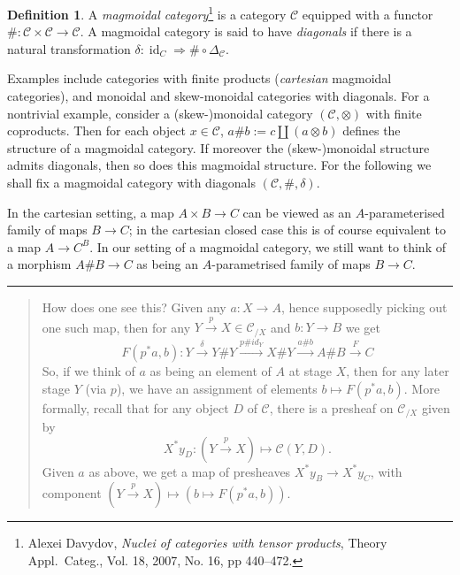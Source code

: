 \documentclass{tufte-handout}
\theoremstyle{definition}
\newtheorem*{definition}{Definition}
\DeclareMathOperator{\id}{id}
\DeclareMathOperator{\Pre}{Pre}
\def\CC{\mathcal{C}}
\begin{document}
\begin{definition}
A \emph{magmoidal category}\footnote{Alexei Davydov, \emph{Nuclei of categories with tensor products}, Theory
Appl.\ Categ., Vol. 18, 2007, No. 16, pp 440--472.} is a category $\CC$ equipped with a functor $\# \colon \CC\times \CC\to \CC$.
A magmoidal category is said to have \emph{diagonals} if there is a natural transformation $\delta\colon \id_C \Rightarrow \#\circ \Delta_\CC$. 
\end{definition}


Examples include categories with finite products (\emph{cartesian} magmoidal categories), and monoidal and skew-monoidal categories with diagonals.
For a nontrivial example, consider a (skew-)monoidal category $(\mathcal{C},\otimes)$ with finite coproducts. 
Then for each object $x\in \mathcal{C}$, $a\# b := c\amalg (a\otimes b)$ defines the structure of a magmoidal category.
If moreover the (skew-)monoidal structure admits diagonals, then so does this magmoidal structure.
For the following we shall fix a magmoidal category with diagonals $(\CC,\#,\delta)$.


In the cartesian setting, a map $A\times B \to C$ can be viewed as an $A$-parameterised family of maps $B\to C$; in the cartesian closed case this is of course equivalent to a map $A \to C^B$.
In our setting of a magmoidal category, we still want to think of a morphism $A\# B \to C$ as being an $A$-parametrised family of maps $B\to C$.

\medskip

\hrule
\begin{quote}
\small How does one see this? Given any $a\colon X\to A$, hence supposedly picking out one such map, then for any $Y\xrightarrow{p} X \in \mathcal{C}_{/X}$ and $b\colon Y\to B$ we get 
\[
F(p^*a,b)\colon Y\xrightarrow{\delta} Y\# Y \xrightarrow{p\# id_Y} X\# Y \xrightarrow{a\# b} A \# B \xrightarrow{F} C
\] 
So, if we think of $a$ as being an element of $A$ at stage $X$, then for any later stage $Y$ (via $p$), we have an assignment of elements $b\mapsto F(p^*a,b)$.
More formally, recall that for any object $D$ of $\mathcal{C}$, there is a presheaf on $\mathcal{C}_{/X}$ given by 
\[
  X^*y_D\colon (Y\xrightarrow{p} X) \mapsto \mathcal{C}(Y,D).
\] 
Given $a$ as above, we get a map of presheaves $X^*y_B \to X^*y_C$, with component $(Y\xrightarrow{p} X)  \mapsto \left(b\mapsto F(p^*a,b)\right)$.
\end{quote}
\end{document}
